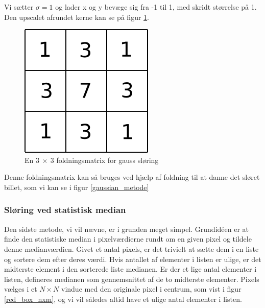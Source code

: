 {Vi sætter $\sigma = 1$ og lader x og y bevæge sig fra -1 til 1, med skridt størrelse
på 1. Den upscalet afrundet kerne kan se på figur \ref{gauss}.

\begin{figure}[h]
	\begin{center}
		\includegraphics[scale=0.5,angle=0]{afsnit/vores_implementation/billeder/sloering/gauss}
	\end{center}
	\caption[]{En $3~\times{}~3$ foldningsmatrix for gauss sløring}
	\label{gauss}
\end{figure}

Denne foldningsmatrix kan så bruges ved hjælp af foldning til at danne det sløret
billet, som vi kan se i figur \ref{gaussian_metode}

\subsubsection*{Sløring ved statistisk median}
Den sidste metode, vi vil nævne, er i grunden meget simpel. Grundidéen
er at finde den statistiske median i pixelværdierne rundt om en given
pixel og tildele denne medianværdien. Givet et antal pixels, er det
trivielt at sætte dem i en liste og sortere dem efter deres værdi. Hvis
antallet af elementer i listen er ulige, er det midterste element i den
sorterede liste medianen. Er der et lige antal elementer i listen,
defineres medianen som gennemsnittet af de to midterste elementer.
Pixels vælges i et $N \times N$ vindue med den originale pixel i
centrum, som vist i figur \ref{red_box_nxm}, og vi vil således altid
have et ulige antal elementer i listen.

}
